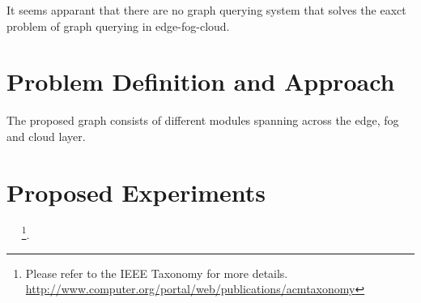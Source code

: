 \documentclass[conference]{IEEEtran}
\begin{document}
It seems apparant that there are no graph querying system that solves the eaxct problem of graph querying in edge-fog-cloud. 

\section{Problem Definition and Approach}

The proposed graph consists of different modules spanning across the edge, fog and cloud layer.  

\section{Proposed Experiments}

~\cite{simmhan:cise:2013} ~\footnote{Please refer to the IEEE Taxonomy for more details. \url{http://www.computer.org/portal/web/publications/acmtaxonomy}}.






\end{document}
